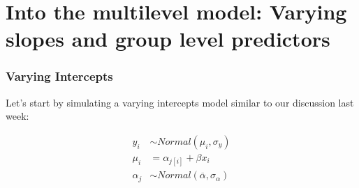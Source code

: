 \documentclass[
  letterpaper,
  DIV=11,
  numbers=noendperiod]{scrartcl}
\author{}
\date{}
\begin{document}
\section{Into the multilevel model: Varying slopes and group level
predictors}\label{into-the-multilevel-model-varying-slopes-and-group-level-predictors}

\subsubsection{Varying Intercepts}\label{varying-intercepts}

Let's start by simulating a varying intercepts model similar to our
discussion last week:

\[
\begin{align*}
y_i &\sim Normal(\mu_i, \sigma_y)\\
\mu_i &= \alpha_{j[i]} + \beta x_i\\
\alpha_j &\sim Normal(\overline{\alpha}, \sigma_{\alpha})
\end{align*}
\]
\end{document}
